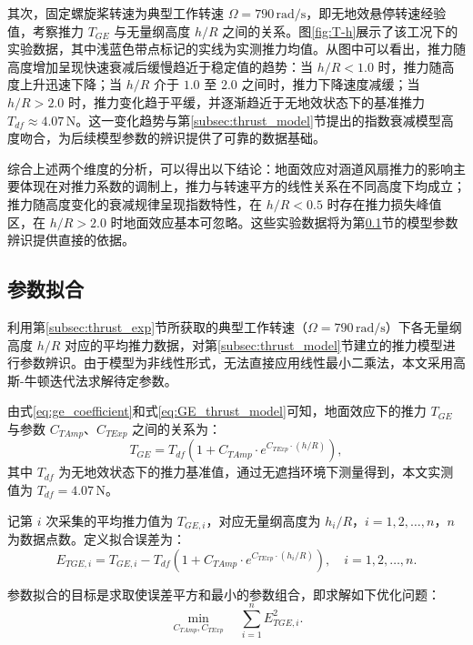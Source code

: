 其次，固定螺旋桨转速为典型工作转速 $\Omega = 790\,\mathrm{rad/s}$，即无地效悬停转速经验值，考察推力 $T_{GE}$ 与无量纲高度 $h/R$ 之间的关系。图\ref{fig:T-h}展示了该工况下的实验数据，其中浅蓝色带点标记的实线为实测推力均值。从图中可以看出，推力随高度增加呈现快速衰减后缓慢趋近于稳定值的趋势：当 $h/R < 1.0$ 时，推力随高度上升迅速下降；当 $h/R$ 介于 $1.0$ 至 $2.0$ 之间时，推力下降速度减缓；当 $h/R > 2.0$ 时，推力变化趋于平缓，并逐渐趋近于无地效状态下的基准推力 $T_{df} \approx 4.07\,\mathrm{N}$。这一变化趋势与第\ref{subsec:thrust_model}节提出的指数衰减模型高度吻合，为后续模型参数的辨识提供了可靠的数据基础。

综合上述两个维度的分析，可以得出以下结论：地面效应对涵道风扇推力的影响主要体现在对推力系数的调制上，推力与转速平方的线性关系在不同高度下均成立；推力随高度变化的衰减规律呈现指数特性，在 $h/R < 0.5$ 时存在推力损失峰值区，在 $h/R > 2.0$ 时地面效应基本可忽略。这些实验数据将为第\ref{subsec:thrust_fitting}节的模型参数辨识提供直接的依据。

\subsection{参数拟合}
\label{subsec:thrust_fitting}

利用第\ref{subsec:thrust_exp}节所获取的典型工作转速（$\Omega = 790\,\mathrm{rad/s}$）下各无量纲高度 $h/R$ 对应的平均推力数据，对第\ref{subsec:thrust_model}节建立的推力模型进行参数辨识。由于模型为非线性形式，无法直接应用线性最小二乘法，本文采用高斯-牛顿迭代法求解待定参数。

由式\eqref{eq:ge_coefficient}和式\eqref{eq:GE_thrust_model}可知，地面效应下的推力 $T_{GE}$ 与参数 $C_{TAmp}$、$C_{TExp}$ 之间的关系为：
\begin{equation}
    T_{GE} = T_{df}\left(1 + C_{TAmp} \cdot e^{C_{TExp} \cdot (h/R)}\right),
    \label{eq:thrust_fit_model}
\end{equation}
其中 $T_{df}$ 为无地效状态下的推力基准值，通过无遮挡环境下测量得到，本文实测值为 $T_{df} = 4.07\,\mathrm{N}$。

记第 $i$ 次采集的平均推力值为 $T_{GE,i}$，对应无量纲高度为 $h_i/R$，$i = 1,2,\dots,n$，$n$ 为数据点数。定义拟合误差为：
\begin{equation}
    E_{TGE,i} = T_{GE,i} - T_{df}\left(1 + C_{TAmp} \cdot e^{C_{TExp} \cdot (h_i/R)}\right),\quad i = 1,2,\dots,n.
\end{equation}

参数拟合的目标是求取使误差平方和最小的参数组合，即求解如下优化问题：
\begin{equation}
    \min_{C_{TAmp}, C_{TExp}} \quad \sum_{i=1}^{n} E_{TGE,i}^2.
    \label{eq:ls_obj}
\end{equation}

